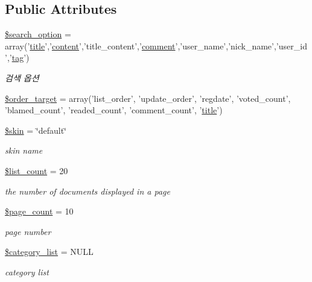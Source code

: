 \subsection*{Public Attributes}
\begin{DoxyCompactItemize}
\item 
\hyperlink{classboard_a6affe0c86966ebd06572cc4c8abde32b}{\$search\+\_\+option} = array('\hyperlink{ko_8install_8php_a5b072c5fd1d2228c6ba5cee13cd142e3}{title}','\hyperlink{classcontent}{content}','title\+\_\+content','\hyperlink{classcomment}{comment}','user\+\_\+name','nick\+\_\+name','user\+\_\+id','\hyperlink{classtag}{tag}')
\begin{DoxyCompactList}\small\item\em 검색 옵션 \end{DoxyCompactList}\item 
\hyperlink{classboard_a66d1965fe6a51e8143499adeaf3998cc}{\$order\+\_\+target} = array('list\+\_\+order', 'update\+\_\+order', 'regdate', 'voted\+\_\+count', 'blamed\+\_\+count', 'readed\+\_\+count', 'comment\+\_\+count', '\hyperlink{ko_8install_8php_a5b072c5fd1d2228c6ba5cee13cd142e3}{title}')
\item 
\hyperlink{classboard_ac7e864ad1db563c4d3f97291dd90291f}{\$skin} = \char`\"{}default\char`\"{}
\begin{DoxyCompactList}\small\item\em skin name \end{DoxyCompactList}\item 
\hyperlink{classboard_ab66c6932a082c110ebd921c0be8d6788}{\$list\+\_\+count} = 20
\begin{DoxyCompactList}\small\item\em the number of documents displayed in a page \end{DoxyCompactList}\item 
\hyperlink{classboard_ab5d2d3925f753039483da2c65076122b}{\$page\+\_\+count} = 10
\begin{DoxyCompactList}\small\item\em page number \end{DoxyCompactList}\item 
\hyperlink{classboard_aee8ebe65314796fea517f8f7875a4b8f}{\$category\+\_\+list} = N\+U\+L\+L
\begin{DoxyCompactList}\small\item\em category list \end{DoxyCompactList}\end{DoxyCompactItemize}


